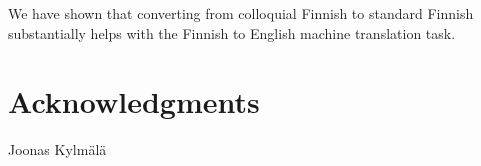 \documentclass[11pt]{article}
\begin{document}
We have shown that converting from colloquial Finnish to standard Finnish substantially
helps with the Finnish to English machine translation task.

\section*{Acknowledgments}

Joonas Kylm\"{a}l\"{a}



\end{document}
